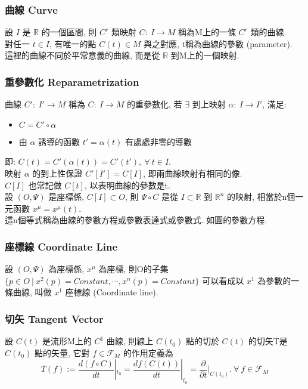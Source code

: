\documentclass{article}
\begin{document}
\begin{CJK}{UTF8}{bsmi}
\subsubsection{曲線 Curve}
設 $ I$ 是 $\mathbb{R}$ 的一個區間, 則 $C^r$  類映射 $C:\ I \rightarrow M$ 稱為M上的一條 $C^r$ 類的曲線.
\\ 對任一 $t\in I$, 有唯一的點 $C(t)\in M$ 與之對應, t稱為曲線的參數 (parameter).
\\ 這裡的曲線不同於平常意義的曲線, 而是從 $\mathbb{R}$ 到M上的一個映射.
\subsubsection{重參數化 Reparametrization}
曲線 $C':\ I'\rightarrow M$ 稱為 $C:\ I\rightarrow M $ 的重參數化, 若 $\exists$ 到上映射 $\alpha :\ I\rightarrow I'$, 滿足:
\begin{itemize}
  \item $C=C' \circ \alpha$
  \item 由 $\alpha$ 誘導的函數 $t'=\alpha (t)$ 有處處非零的導數
\end{itemize}
即: $C(t)=C'(\alpha(t))=C'(t') ,\ \forall \ t\in I$.\\
映射 $\alpha$ 的到上性保證 $C'[I']=C[I]$, 即兩曲線映射有相同的像.
\\ $C[I]$ 也常記做 $C[t]$, 以表明曲線的參數是t.
\\ 設 $(O,\Psi)$ 是座標係, $C[I]\subset O$, 則 $\Psi \circ C$ 是從 $I \subset \mathbb{R}$ 到 $\mathbb{R}^n$ 的映射, 相當於n個一元函數 $x^\mu=x^\mu(t)$. 
\\這n個等式稱為曲線的參數方程或參數表達式或參數式. 如圓的參數方程.
\subsubsection{座標線 Coordinate Line}
設 $(O,\Psi)$ 為座標係, $x^\mu$ 為座標, 則O的子集 $\{p\in O\ |\ x^2(p)=Constant, \cdots, x^n(p)=Constant \}$ 可以看成以 $x^1$ 為參數的一條曲線, 叫做 $x^1$ 座標線 (Coordinate line).
\subsubsection{切矢 Tangent Vector}
設 $C(t)$ 是流形M上的 $C^1$ 曲線, 則線上 $C(t_0)$ 點的切於 $C(t)$ 的切矢T是 $C(t_0)$ 點的矢量, 它對 $f\in \mathscr{F}_M$ 的作用定義為 $$ T(f):=\frac{d (f \circ C)}{dt}|_{t_0}=\frac{df(C(t))}{dt}|_{t_0}=\frac{\partial}{\partial t}|_{C(t_0)}. \ \forall \ f\in \mathscr{F}_M$$
\\ 


\end{CJK}
\end{document}
